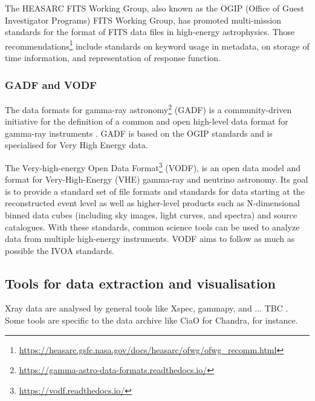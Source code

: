 \documentclass[11pt,a4paper]{ivoa}
\begin{document}
The HEASARC FITS Working Group, also known as the OGIP (Office of Guest Investigator Programs) FITS Working Group, has promoted multi-mission standards for the format of FITS data files in high-energy astrophysics. Those recommendations\footnote{\url{https://heasarc.gsfc.nasa.gov/docs/heasarc/ofwg/ofwg_recomm.html}} include standards on keyword usage in metadata, on storage of time information, and representation of response function.



\subsubsection{GADF and VODF}
\label{sec:GADF}

The data formats for gamma-ray astronomy\footnote{\url{https://gamma-astro-data-formats.readthedocs.io/}} (GADF) is a community-driven initiative for the definition of a common and open high-level data format for gamma-ray instruments \citep{2021-DF}. GADF is based on the OGIP standards and is specialised for Very High Energy data.

The Very-high-energy Open Data Format\footnote{\url{https://vodf.readthedocs.io/}} (VODF), is an open data model and format for Very-High-Energy (VHE) gamma-ray and neutrino astronomy. Its goal is to provide a standard set of file formats and standards for data starting at the reconstructed event level as well as higher-level products such as N-dimensional binned data cubes (including sky images, light curves, and spectra) and source catalogues. With these standards, common science tools can be used to analyze data from multiple high-energy instruments. VODF aims to follow as much as possible the IVOA standards.


\subsection{Tools for data extraction and visualisation}
Xray data are analysed by general tools like Xspec, gammapy, and ... TBC .
Some tools are specific to the data archive like CiaO for Chandra, for instance.

\end{document}
